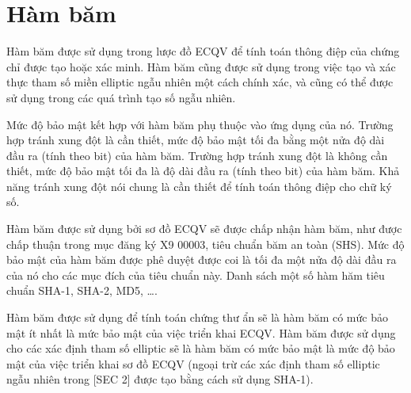 \documentclass[a4paper,12pt]{report}
\begin{document}
\section{Hàm băm}
Hàm băm được sử dụng trong lược đồ ECQV để tính toán thông điệp của chứng chỉ được tạo hoặc xác minh. Hàm băm cũng được sử dụng trong việc tạo và xác thực tham số miền elliptic ngẫu nhiên một cách chính xác, và cũng có thể được sử dụng trong các quá trình tạo số ngẫu nhiên.

Mức độ bảo mật kết hợp với hàm băm phụ thuộc vào ứng dụng của nó. Trường hợp tránh xung đột là cần thiết, mức độ bảo mật tối đa bằng một nửa độ dài đầu ra (tính theo bit) của hàm băm. Trường hợp tránh xung đột là không cần thiết, mức độ bảo mật tối đa là độ dài đầu ra (tính theo bit) của hàm băm. Khả năng tránh xung đột nói chung là cần thiết để tính toán thông điệp cho chữ ký số.

Hàm băm được sử dụng bởi sơ đồ ECQV sẽ được chấp nhận hàm băm, như được chấp thuận trong mục đăng ký X9 00003, tiêu chuẩn băm an toàn (SHS). Mức độ bảo mật của hàm băm được phê duyệt được coi là tối đa một nửa độ dài đầu ra của nó cho các mục đích của tiêu chuẩn này. Danh sách một số hàm hăm tiêu chuẩn SHA-1, SHA-2, MD5, \ldots.

Hàm băm được sử dụng để tính toán chứng thư ẩn sẽ là hàm băm có mức bảo mật ít nhất là mức bảo mật của việc triển khai ECQV. Hàm băm được sử dụng cho các xác định tham số  elliptic sẽ là hàm băm có mức bảo mật là mức độ bảo mật của việc triển khai sơ đồ ECQV (ngoại trừ các xác định tham số elliptic ngẫu nhiên trong [SEC 2] được tạo bằng cách sử dụng SHA-1).
\end{document}

